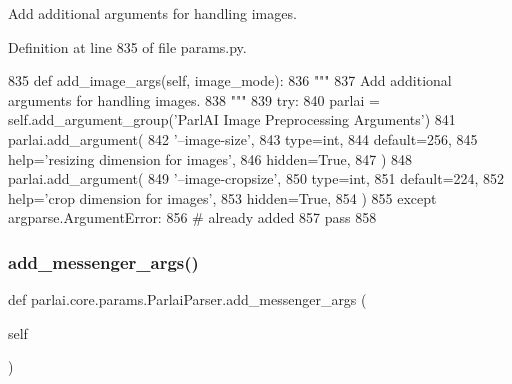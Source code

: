 \begin{DoxyVerb}Add additional arguments for handling images.
\end{DoxyVerb}
 

Definition at line 835 of file params.\+py.


\begin{DoxyCode}
835     \textcolor{keyword}{def }add\_image\_args(self, image\_mode):
836         \textcolor{stringliteral}{"""}
837 \textcolor{stringliteral}{        Add additional arguments for handling images.}
838 \textcolor{stringliteral}{        """}
839         \textcolor{keywordflow}{try}:
840             parlai = self.add\_argument\_group(\textcolor{stringliteral}{'ParlAI Image Preprocessing Arguments'})
841             parlai.add\_argument(
842                 \textcolor{stringliteral}{'--image-size'},
843                 type=int,
844                 default=256,
845                 help=\textcolor{stringliteral}{'resizing dimension for images'},
846                 hidden=\textcolor{keyword}{True},
847             )
848             parlai.add\_argument(
849                 \textcolor{stringliteral}{'--image-cropsize'},
850                 type=int,
851                 default=224,
852                 help=\textcolor{stringliteral}{'crop dimension for images'},
853                 hidden=\textcolor{keyword}{True},
854             )
855         \textcolor{keywordflow}{except} argparse.ArgumentError:
856             \textcolor{comment}{# already added}
857             \textcolor{keywordflow}{pass}
858 
\end{DoxyCode}
\mbox{\label{classparlai_1_1core_1_1params_1_1ParlaiParser_aed38c7346112f11851969224cb25ad1e}} 
\subsubsection{\texorpdfstring{add\+\_\+messenger\+\_\+args()}{add\_messenger\_args()}}
{\footnotesize\ttfamily def parlai.\+core.\+params.\+Parlai\+Parser.\+add\+\_\+messenger\+\_\+args (\begin{DoxyParamCaption}\item[{}]{self }\end{DoxyParamCaption})}


